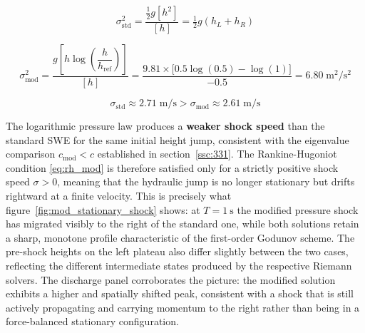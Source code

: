 \begin{equation}
    \sigma_{\mathrm{std}}^2 = \frac{\tfrac{1}{2}g[h^2]}{[h]} 
    = \tfrac{1}{2}g(h_L+h_R)
    \label{eq:sigma_std_explicit}
\end{equation}

\begin{equation}
    \sigma_{\mathrm{mod}}^2 
    = \frac{g\!\left[h\log\!\left(\dfrac{h}{h_{\mathrm{ref}}}
      \right)\right]}{[h]}
    = \frac{9.81\times\bigl[0.5\log(0.5) - \log(1)\bigr]}{-0.5}
    = 6.80\;\mathrm{m^2/s^2}
    \label{eq:sigma_mod_explicit}
\end{equation}

\begin{equation}
    \sigma_{\mathrm{std}} \approx 2.71\;\mathrm{m/s} 
    > \sigma_{\mathrm{mod}} \approx 2.61\;\mathrm{m/s}
    \label{eq:sigma_comparison}
\end{equation}

The logarithmic pressure law produces a \textbf{weaker shock speed} than the standard SWE for the same initial height jump, consistent with the eigenvalue comparison $c_{\mathrm{mod}} < c$ established in section~\ref{ssc:331}. The Rankine-Hugoniot condition \eqref{eq:rh_mod} is therefore satisfied only for a strictly positive shock speed \( \sigma > 0 \), meaning that the hydraulic jump is no longer stationary but drifts rightward at a finite velocity. This is precisely what figure~\ref{fig:mod_stationary_shock} shows: at \( T = \SI{1}{\second} \) the modified pressure shock has migrated visibly to the right of the standard one, while both solutions retain a sharp, monotone profile characteristic of the first-order Godunov scheme. The pre-shock heights on the left plateau also differ slightly between the two cases, reflecting the different intermediate states produced by the respective Riemann solvers. The discharge panel corroborates the picture: the modified solution exhibits a higher and spatially shifted peak, consistent with a shock that is still actively propagating and carrying momentum to the right rather than being in a force-balanced stationary configuration.

